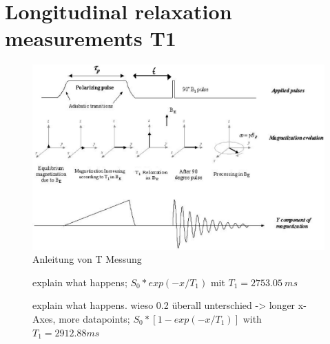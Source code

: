 \section{Longitudinal relaxation measurements T1}



\begin{figure}[H]
    \centering
    \includegraphics[width= \textwidth]{BildT1.png}   
    \caption[]{Anleitung von T Messung \cite{Bild}}
    \label{fig:BildT1}
\end{figure}

\begin{figure}[H]
    \centering
    
    \caption[]{explain what happens; $S_0 * exp(-x/T_1)$ mit $T_1=\SI{2753.05}{ms}$}
    \label{fig:T1Erdmagnetfeld}
\end{figure}

\begin{figure}[H]
    \centering
    
    \caption[]{explain what happens. wieso 0.2 überall unterschied -> longer x-Axes, more datapoints; $S_0 *[1-exp(-x/T_1)]$ with $T_1=\si{2912.88}{ms}$}
    \label{fig:T1Polarisationsfeldfeld}
\end{figure}
